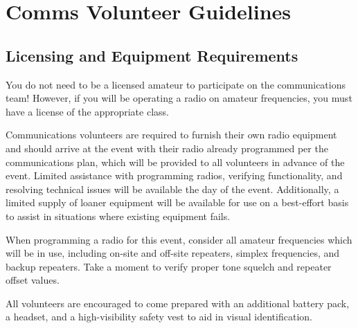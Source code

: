 \documentclass[pdflatex,letterpaper,twoside,12pt]{book}
\begin{document}

\chapter{Comms Volunteer Guidelines}

\iffalse %
....SOMEWHERE IN THIS CHAPTER...
 * Stop and listen before making a call!
 * Cross Band - allow repeater to drop
 * You are an event guide and a Professional Communicator, be visible
   and answer questions, help out, go above and beyond 
\fi %

\section{Licensing and Equipment Requirements}

You do not need to be a licensed amateur to participate on the communications team!  However, if you will be operating a radio on amateur frequencies, you must have a license of the appropriate class.

Communications volunteers are required to furnish their own radio equipment and should arrive at the event with their radio already programmed per the communications plan, which will be provided to all volunteers in advance of the event.  Limited assistance with programming radios, verifying functionality, and resolving technical issues will be available the day of the event.  Additionally, a limited supply of loaner equipment will be available for use on a best-effort basis to assist in situations where existing equipment fails.

When programming a radio for this event, consider all amateur frequencies which will be in use, including on-site and off-site repeaters, simplex frequencies, and backup repeaters.  Take a moment to verify proper tone squelch and repeater offset values.

All volunteers are encouraged to come prepared with an additional battery pack, a headset, and a high-visibility safety vest to aid in visual identification.

\end{document}
